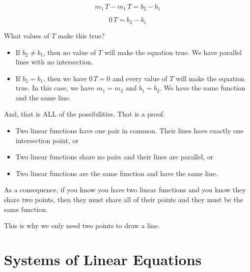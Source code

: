 \documentclass{ximera}
\begin{document}
\begin{explanation}
\[     m_1 \, T - m_1 \, T =  b_2 - b_1 \]


\[     0 \, T =  b_2 - b_1 \]


What values of $T$ make this true?


\begin{itemize}
\item If $b_2 \ne b_1$, then no value of $T$ will make the equation true.  We have parallel lines with no intersection.

\item If $b_2 = b_1$, then we have $0 \, T =  0$ and every value of $T$ will make the equation true.  In this case, we have $m_1 = m_2$ and $b_1 = b_2$.  We have the same function and the same line.
\end{itemize}



And, that is ALL of the possibilities.  That is a proof.


\begin{itemize}
\item Two linear functions have one pair in common. Their lines have exactly one intersection point, or

\item Two linear functions share no pairs and their lines are parallel, or

\item Two linear functions are the same function and have the same line.



\end{itemize}





\end{explanation}


As a consequence, if you know you have two linear functions and you know they share two points, then they must share all of their points and they must be the same function.   

This is why we only need two points to draw a line.
















\section{Systems of Linear Equations}
\end{document}
